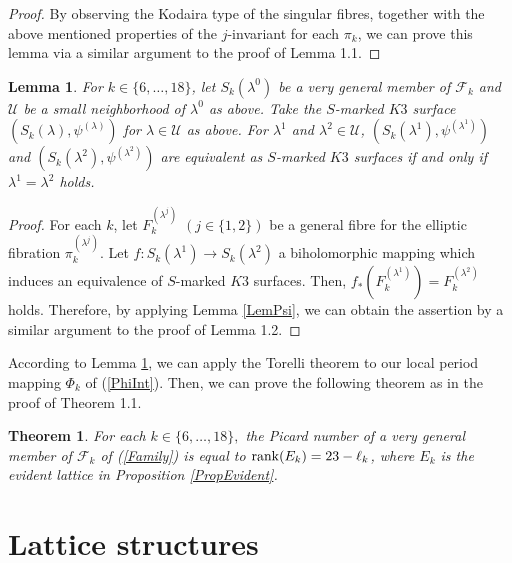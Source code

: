 \documentclass[10pt]{article}
\newtheorem{thm}{Theorem}[section]
\newtheorem{lem}{Lemma}[section]
\begin{document}
\begin{proof}
By observing the Kodaira type of the singular fibres, together with the above mentioned  properties of the $j$-invariant for each $\pi_k$, 
we can prove this lemma via a similar argument to the proof of \cite{NaP} Lemma 1.1. 
\end{proof}



\begin{lem}\label{LemSEquiv}
For $k\in \{6,\ldots,18\}$, let $S_k (\lambda^0)$ be a very general member of $\mathscr{F}_k$ and $\mathcal{U} $ be a small neighborhood of $\lambda^0$ as above.
 Take the $S$-marked $K3$ surface $\left(S_k(\lambda), \psi^{(\lambda)} \right)$ for  $\lambda \in \mathcal{U}$ as above.
For $\lambda^1$ and $\lambda^2 \in \mathcal{U}$,
$\left(S_k(\lambda^1),\psi^{\left( \lambda^1 \right)} \right)$ and $\left(S_k(\lambda^2),\psi^{\left( \lambda^2 \right)} \right)$ are equivalent as $S$-marked $K3$ surfaces if and only if   $\lambda^1 = \lambda^2$ holds.
\end{lem}


\begin{proof}
For each $k$,
let $F_k^{\left( \lambda^j \right)}$ $(j\in \{ 1,2 \})$ be a general fibre for the elliptic fibration $\pi_k^{\left( \lambda^j \right)}$.
Let  
$f: S_k(\lambda^1) \rightarrow S_k(\lambda^2)$
a biholomorphic mapping 
which induces an equivalence of $S$-marked $K3$ surfaces.
Then,   $f_* \left(F_k^{\left( \lambda^1 \right)}\right) = F_k^{\left( \lambda^2 \right)}$ holds.
Therefore, 
by applying Lemma \ref{LemPsi},
we can obtain the assertion
by a similar argument to the proof of \cite{NaP} Lemma 1.2.
\end{proof}


According to Lemma \ref{LemSEquiv},
we can apply  the Torelli theorem to our local period mapping $\Phi_k$ of (\ref{PhiInt}).
Then, we can prove the following theorem as in the proof of \cite{NaP} Theorem 1.1.


 \begin{thm}\label{ThmPic}
For each $k\in \{6,\ldots,18\},$
the Picard number of a  very general member of  $\mathscr{F}_k$ of (\ref{Family}) 
is equal to ${\rm rank}(E_k)=23-\ell_{k}$, where $E_k$ is the evident lattice in Proposition \ref{PropEvident}.
\end{thm}




\section{Lattice structures}
\end{document}

